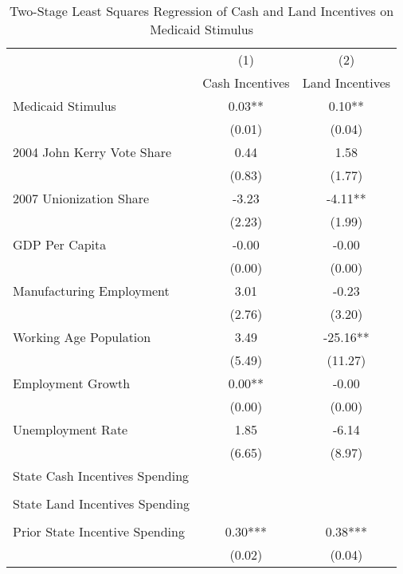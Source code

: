 \begin{table}[!htbp]\centering
\def\sym#1{\ifmmode^{#1}\else\(^{#1}\)\fi}
\caption{Two-Stage Least Squares Regression of Cash and Land Incentives on Medicaid Stimulus}
\begin{tabular}{l*{2}{c}}
\hline\hline
                    &\multicolumn{1}{c}{(1)}   &\multicolumn{1}{c}{(2)}   \\
                    &Cash Incentives   &Land Incentives   \\
\hline
Medicaid Stimulus   &        0.03** &        0.10** \\
                    &      (0.01)   &      (0.04)   \\
2004 John Kerry Vote Share&        0.44   &        1.58   \\
                    &      (0.83)   &      (1.77)   \\
2007 Unionization Share&       -3.23   &       -4.11** \\
                    &      (2.23)   &      (1.99)   \\
GDP Per Capita      &       -0.00   &       -0.00   \\
                    &      (0.00)   &      (0.00)   \\
Manufacturing Employment&        3.01   &       -0.23   \\
                    &      (2.76)   &      (3.20)   \\
Working Age Population&        3.49   &      -25.16** \\
                    &      (5.49)   &     (11.27)   \\
Employment Growth   &        0.00** &       -0.00   \\
                    &      (0.00)   &      (0.00)   \\
Unemployment Rate   &        1.85   &       -6.14   \\
                    &      (6.65)   &      (8.97)   \\
State Cash Incentives Spending&               &               \\
                    &               &               \\
State Land Incentives Spending&               &               \\
                    &               &               \\
Prior State Incentive Spending&        0.30***&        0.38***\\
                    &      (0.02)   &      (0.04)   \\

\end{tabular}
\end{table}
